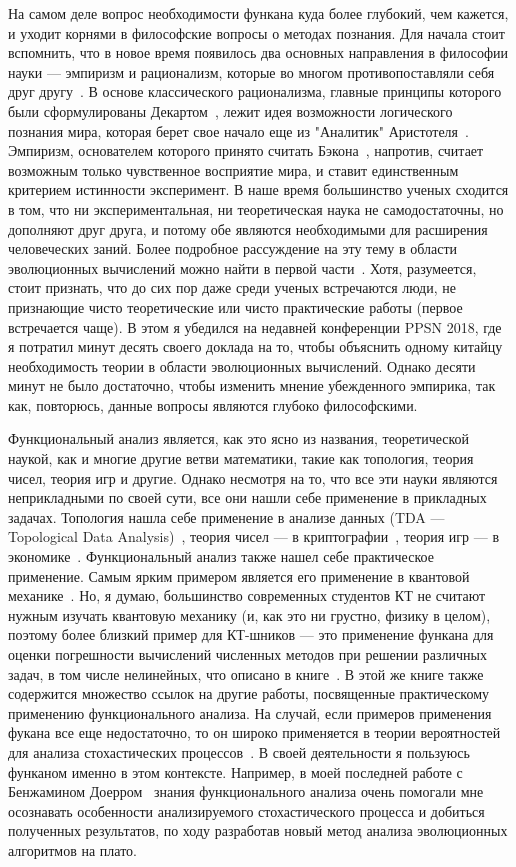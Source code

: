 \documentclass[russian]{article}
\begin{document}
На самом деле вопрос необходимости функана куда более глубокий, чем кажется, и уходит корнями в философские вопросы о методах познания. Для начала стоит вспомнить, что в новое время появилось два основных направления в философии науки --- эмпиризм и рационализм, которые во многом противопоставляли себя друг другу~\cite{phil}. В основе классического рационализма, главные принципы которого были сформулированы Декартом~\cite{descartes}, лежит идея возможности логического познания мира, которая берет свое начало еще из "Аналитик" Аристотеля~\cite{aristotel}. Эмпиризм, основателем которого принято считать Бэкона~\cite{bacon}, напротив, считает возможным только чувственное восприятие мира, и ставит единственным критерием истинности эксперимент. В наше время большинство ученых сходится в том, что ни экспериментальная, ни теоретическая наука не самодостаточны, но дополняют друг друга, и потому обе являются необходимыми для расширения человеческих заний. Более подробное рассуждение на эту тему в области эволюционных вычислений можно найти в первой части~\cite{doerr}. Хотя, разумеется, стоит признать, что до сих пор даже среди ученых встречаются люди, не признающие чисто теоретические или чисто практические работы (первое встречается чаще). В этом я убедился на недавней конференции PPSN 2018, где я потратил минут десять своего доклада на то, чтобы объяснить одному китайцу необходимость теории в области эволюционных вычислений. Однако десяти минут не было достаточно, чтобы изменить мнение убежденного эмпирика, так как, повторюсь, данные вопросы являются глубоко философскими.

Функциональный анализ является, как это ясно из названия, теоретической наукой, как и многие другие ветви математики, такие как топология, теория чисел, теория игр и другие. Однако несмотря на то, что все эти науки являются неприкладными по своей сути, все они нашли себе применение в прикладных задачах. Топология нашла себе применение в анализе данных (TDA --- Topological Data Analysis)~\cite{topology}, теория чисел --- в криптографии~\cite{numbers}, теория игр --- в экономике~\cite{games}. Функциональный анализ также нашел себе практическое применение. Самым ярким примером является его применение в квантовой механике~\cite{quantum}. Но, я думаю, большинство современных студентов КТ не считают нужным изучать квантовую механику (и, как это ни грустно, физику в целом), поэтому более близкий пример для КТ-шников --- это применение функана для оценки погрешности вычислений численных методов при решении различных задач, в том числе нелинейных, что описано в книге~\cite{kollats}. В этой же книге также содержится множество ссылок на другие работы, посвященные практическому применению функционального анализа. На случай, если примеров применения фукана все еще недостаточно, то он широко применяется в теории вероятностей для анализа стохастических процессов~\cite{prob}. В своей деятельности я пользуюсь функаном именно в этом контексте. Например, в моей последней работе с Бенжамином Доерром~\cite{plateau} знания функционального анализа очень помогали мне осознавать особенности анализируемого стохастического процесса и добиться полученных результатов, по ходу разработав новый метод анализа эволюционных алгоритмов на плато.
\end{document}
